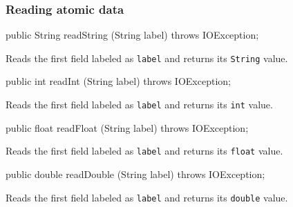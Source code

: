 \subsubsection*{Reading atomic data}
\begin{code}

   public String readString (String label) throws IOException;
\end{code}
\begin{tabb}
Reads the first field labeled as \texttt{label} and returns its \texttt{String} value.
\end{tabb}
\begin{code}

   public int readInt (String label) throws IOException;
\end{code}
\begin{tabb}
Reads the first field labeled as \texttt{label} and returns its \texttt{int} value.
\end{tabb}
\begin{code}

   public float readFloat (String label) throws IOException;
\end{code}
\begin{tabb}
Reads the first field labeled as \texttt{label} and returns its \texttt{float} value.
\end{tabb}
\begin{code}

   public double readDouble (String label) throws IOException;
\end{code}
\begin{tabb}
Reads the first field labeled as \texttt{label} and returns its \texttt{double} value.
\end{tabb}

